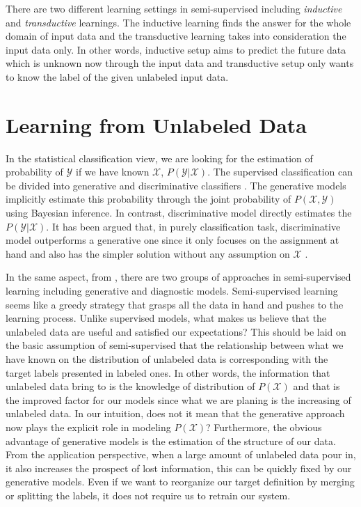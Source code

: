 There are two different learning settings in semi-supervised including \textit{inductive} and \textit{transductive} learnings. The inductive learning finds the answer for the whole domain of input data and the transductive learning takes into consideration the input data only. In other words, inductive setup aims to predict the future data which is unknown now through the input data and transductive setup only wants to know the label of the given unlabeled input data.

\section{Learning from Unlabeled Data}

In the statistical classification view, we are looking for the estimation of probability of $\mathcal{Y}$ if we have known $\mathcal{X}$, $P(\mathcal{Y} | \mathcal{X})$. The supervised classification can be divided into generative and discriminative classifiers \parencite{NIPS2001_2020}. The generative models implicitly estimate this probability through the joint probability of $P(\mathcal{X}, \mathcal{Y})$ using Bayesian inference. In contrast, discriminative model directly estimates the $P(\mathcal{Y} | \mathcal{X})$. It has been argued that, in purely classification task, discriminative model outperforms a generative one since it only focuses on the assignment at hand and also has the simpler solution without any assumption on $\mathcal{X}$ \parencite{Vapnik1998a}. 

In the same aspect, from \parencite{Olivier2006}, there are two groups of approaches in semi-supervised learning including generative and diagnostic models. Semi-supervised learning seems like a greedy strategy that grasps all the data in hand and pushes to the learning process. Unlike supervised models, what makes us believe that the unlabeled data are useful and satisfied our expectations? This should be laid on the basic assumption of semi-supervised that the relationship between what we have known on the distribution of unlabeled data is corresponding with the target labels presented in labeled ones. In other words, the information that unlabeled data bring to is the knowledge of distribution of $P(\mathcal{X})$ and that is the improved factor for our models since what we are planing is the increasing of unlabeled data. In our intuition, does not it mean that the generative approach now plays the explicit role in modeling $P(\mathcal{X})$? Furthermore, the obvious advantage of generative models is the estimation of the structure of our data. From the application perspective, when a large amount of unlabeled data pour in, it also increases the prospect of lost information, this can be quickly fixed by our generative models. Even if we want to reorganize our target definition by merging or splitting the labels, it does not require us to retrain our system.

